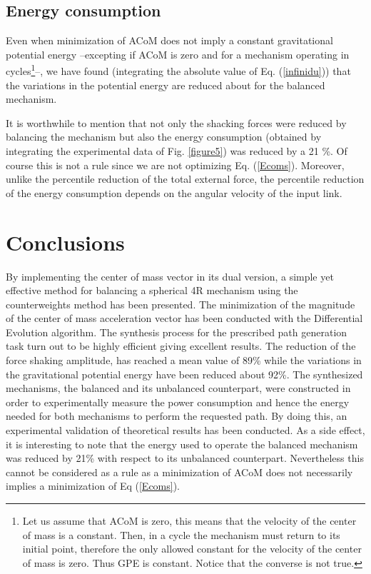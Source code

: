 \documentclass[11pt]{article}
\begin{document}
\subsection*{Energy consumption}
Even when minimization of ACoM does not imply a constant gravitational 
potential energy --excepting if ACoM is zero and 
for a mechanism operating in cycles\footnote{Let us assume that ACoM is 
zero, this means that the velocity of the center of mass is a constant. 
Then, in a cycle the mechanism must return to its initial point, 
therefore the only  allowed constant for the velocity of the center of 
mass is zero. Thus GPE is constant. Notice that the converse is not 
true. }--, we have found (integrating the absolute value of 
Eq. (\ref{infinidu})) that the variations in the potential energy are 
reduced about  for the balanced mechanism.

It is worthwhile to mention that not only the shacking forces were 
reduced by balancing the mechanism but also the energy consumption 
(obtained by integrating the experimental data of Fig. \ref{figure5}) 
was reduced by a 21 \%. Of course this is not a rule since we are not 
optimizing Eq. (\ref{Ecoms}). Moreover, unlike the percentile reduction 
of the total external force, the percentile reduction of the energy 
consumption depends on the angular velocity of the input link. 


\section{Conclusions}\label{conclu}
By implementing the center of mass vector in its dual version, a simple 
yet effective method for balancing a spherical 4R mechanism 
using the counterweights method has been presented. The minimization of 
the magnitude of the center of mass acceleration vector has been 
conducted with the Differential Evolution algorithm.  The synthesis 
process for the prescribed path generation task turn out to be highly 
efficient giving excellent results. The reduction of the force shaking 
amplitude, has reached a mean value of 89\% while the variations in the 
gravitational potential energy have been reduced about 92\%. The 
synthesized mechanisms, the balanced and its unbalanced 
counterpart, were constructed in order to experimentally measure the 
power consumption and hence the energy needed for both mechanisms to 
perform the requested path. By doing this, an experimental validation of 
theoretical results has been conducted. As a side effect, it is 
interesting to note that the energy used to operate the  balanced 
mechanism was reduced by 21\% with respect to its unbalanced 
counterpart. Nevertheless this cannot be considered as a rule as a 
minimization of ACoM does not necessarily implies a minimization of 
Eq (\ref{Ecoms}).
\end{document}

